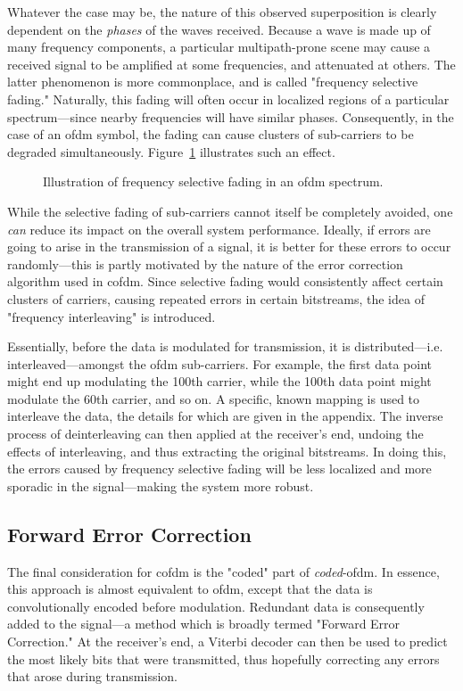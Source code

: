 \documentclass[class=report,11pt,crop=false]{standalone}
\begin{document}
Whatever the case may be, the nature of this observed superposition is clearly dependent on the \emph{phases} of the waves received. Because a wave is made up of many frequency components, a particular multipath-prone scene may cause a received signal to be amplified at some frequencies, and attenuated at others. The latter phenomenon is more commonplace, and is called "frequency selective fading." Naturally, this fading will often occur in localized regions of a particular spectrum---since nearby frequencies will have similar phases. Consequently, in the case of an \gls{ofdm} symbol, the fading can cause clusters of sub-carriers to be degraded simultaneously. Figure~\ref{fig:ofdm-selective-fading} illustrates such an effect.
\begin{figure}[htbp]
    \centering
    \captionsetup{type=figure}
    \def\svgwidth{1\linewidth}
    { %
        }
    \caption{Illustration of frequency selective fading in an \gls{ofdm} spectrum.}
    \label{fig:ofdm-selective-fading}
\end{figure}
While the selective fading of sub-carriers cannot itself be completely avoided, one \emph{can} reduce its impact on the overall system performance. Ideally, if errors are going to arise in the transmission of a signal, it is better for these errors to occur randomly---this is partly motivated by the nature of the error correction algorithm used in \gls{cofdm}. Since selective fading would consistently affect certain clusters of carriers, causing repeated errors in certain bitstreams, the idea of "frequency interleaving" is introduced.

Essentially, before the data is modulated for transmission, it is distributed---i.e. interleaved---amongst the \gls{ofdm} sub-carriers. For example, the first data point might end up modulating the 100th carrier, while the 100th data point might modulate the 60th carrier, and so on. A specific, known mapping is used to interleave the data, the details for which are given in the appendix. The inverse process of deinterleaving can then applied at the receiver's end, undoing the effects of interleaving, and thus extracting the original bitstreams. In doing this, the errors caused by frequency selective fading will be less localized and more sporadic in the signal---making the system more robust.

\subsection{Forward Error Correction}
The final consideration for \gls{cofdm} is the "coded" part of \emph{coded}-\gls{ofdm}. In essence, this approach is almost equivalent to \gls{ofdm}, except that the data is convolutionally encoded before modulation. Redundant data is consequently added to the signal---a method which is broadly termed "Forward Error Correction." At the receiver's end, a Viterbi decoder can then be used to predict the most likely bits that were transmitted, thus hopefully correcting any errors that arose during transmission.
\end{document}
